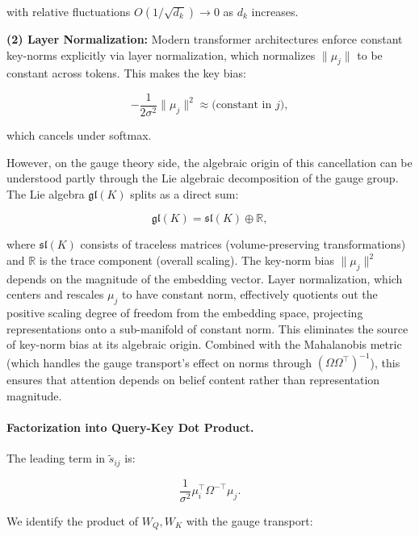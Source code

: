 \documentclass[twoside,11pt]{article}
\begin{document}
with relative fluctuations $O(1/\sqrt{d_k}) \to 0$ as $d_k$ increases.

\textbf{(2) Layer Normalization:}
Modern transformer architectures enforce constant key-norms explicitly via layer normalization, which normalizes $\|\mu_j\|$ to be constant across tokens. This makes the key bias:

\begin{equation}
-\frac{1}{2\sigma^2}\|\mu_j\|^2 \approx \text{(constant in } j\text{)},
\end{equation}

which cancels under softmax.

However, on the gauge theory side, the algebraic origin of this cancellation can be understood partly through the Lie algebraic decomposition of the gauge group. The Lie algebra $\mathfrak{gl}(K)$ splits as a direct sum:

\begin{equation}
\mathfrak{gl}(K) = \mathfrak{sl}(K) \oplus \mathbb{R},
\label{eq:gl_decomposition}
\end{equation}

where $\mathfrak{sl}(K)$ consists of traceless matrices (volume-preserving transformations) and $\mathbb{R}$ is the trace component (overall scaling). The key-norm bias $\|\mu_j\|^2$ depends on the magnitude of the embedding vector. Layer normalization, which centers and rescales $\mu_j$ to have constant norm, effectively quotients out the positive scaling degree of freedom from the embedding space, projecting representations onto a sub-manifold of constant norm. This eliminates the source of key-norm bias at its algebraic origin. Combined with the Mahalanobis metric (which handles the gauge transport's effect on norms through $(\Omega\Omega^\top)^{-1}$), this ensures that attention depends on belief content rather than representation magnitude.

\paragraph{Factorization into Query-Key Dot Product.}

The leading term in $\tilde{s}_{ij}$ is:

\begin{equation}
\frac{1}{\sigma^2}\mu_i^\top \Omega^{-\top} \mu_j.
\end{equation}

We identify the product of $W_Q, W_K$ with the gauge transport:
\end{document}
